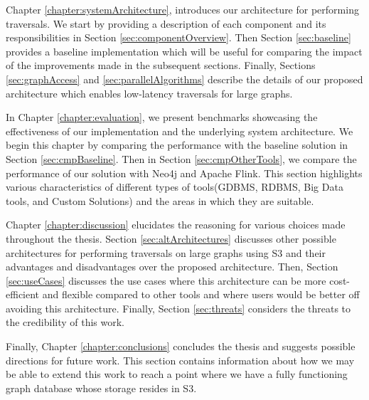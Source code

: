 \medskip
Chapter \ref{chapter:systemArchitecture}, introduces our architecture for
performing traversals. We start by providing a description of each component and
its responsibilities in Section \ref{sec:componentOverview}. 
Then Section \ref{sec:baseline} provides a baseline implementation which will be useful for comparing
the impact of the improvements made in the subsequent sections. Finally, 
Sections \ref{sec:graphAccess} and \ref{sec:parallelAlgorithms} 
describe the details of our proposed architecture
which enables low-latency traversals for large graphs.

\medskip
In Chapter \ref{chapter:evaluation}, we present benchmarks showcasing the
effectiveness of our implementation and the underlying system architecture. We begin this chapter by
comparing the performance with the baseline solution in
Section \ref{sec:cmpBaseline}. Then in Section \ref{sec:cmpOtherTools}, we
compare the performance of our solution with Neo4j and Apache Flink. This
section highlights various characteristics of different types of tools(GDBMS,
RDBMS, Big Data tools, and Custom Solutions) and the areas in which they 
are suitable. 

\medskip
Chapter \ref{chapter:discussion} elucidates the reasoning for various choices
made throughout the thesis.
Section \ref{sec:altArchitectures} discusses other possible architectures for
performing traversals on large graphs using S3 and their advantages and
disadvantages over the proposed architecture. Then,
Section \ref{sec:useCases} discusses the use cases where this architecture
can be more cost-efficient and flexible compared to other tools and where users
would be better off avoiding this architecture. Finally, 
Section \ref{sec:threats} considers the threats to the credibility of this
work.

\medskip
Finally, Chapter \ref{chapter:conclusions} concludes the thesis and
suggests possible directions for future work. This section contains information
about how we may be able to extend this work to reach a point where we have a
fully functioning graph database whose storage resides in S3.
